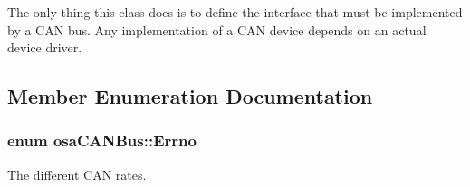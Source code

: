The only thing this class does is to define the interface that must be implemented by a C\-A\-N bus. Any implementation of a C\-A\-N device depends on an actual device driver. 

\subsection{Member Enumeration Documentation}
\hypertarget{classosa_c_a_n_bus_a6fa3e95ec4c36932d0640e40e0748fde}{
\subsubsection[{Errno}]{\setlength{\rightskip}{0pt plus 5cm}enum {\bf osa\-C\-A\-N\-Bus\-::\-Errno}}}\label{classosa_c_a_n_bus_a6fa3e95ec4c36932d0640e40e0748fde}


The different C\-A\-N rates. 

